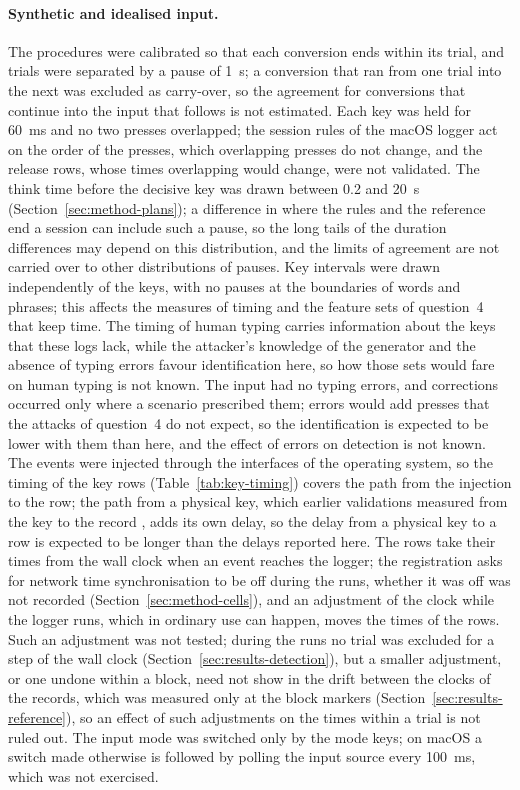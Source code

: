 \paragraph{Synthetic and idealised input.} The procedures were calibrated so that each conversion ends within its trial,
and trials were separated by a pause of 1~s; a conversion that ran from one trial into the next was excluded as
carry-over, so the agreement for conversions that continue into the input that follows is not estimated. Each key was
held for 60~ms and no two presses overlapped; the session rules of the macOS logger act on the order of the presses,
which overlapping presses do not change, and the release rows, whose times overlapping would change, were not validated.
The think time before the decisive key was drawn between 0.2 and 20~s (Section~\ref{sec:method-plans}); a difference
in where the rules and the reference end a session can include such a pause, so the long tails of the duration
differences may depend on this distribution, and the limits of agreement are not carried over to other distributions
of pauses. Key intervals were drawn independently of the keys, with no pauses at the boundaries of words and phrases;
this affects the measures of timing and the feature sets of question~4 that keep time. The timing of human typing
carries information about the keys \citep{monaco2018} that these logs lack, while the attacker's knowledge of the
generator and the absence of typing errors favour identification here, so how those sets would fare on human typing is
not known. The input had no typing errors, and
corrections occurred only where a scenario prescribed them; errors would add presses that the attacks of question~4 do
not expect, so the identification is expected to be lower with them than here, and the effect of errors on detection is
not known. The events were injected through the interfaces of the operating system, so the timing of the key rows
(Table~\ref{tab:key-timing}) covers the path from the injection to the row; the path from a physical key, which earlier
validations measured from the key to the record \citep{pinet2017}, adds its own delay, so the delay from a physical key
to a row is expected to be longer than the delays reported here. The rows take their times from the wall clock when an
event reaches the logger; the registration asks for network time synchronisation to be off during the runs, whether it
was off was not recorded (Section~\ref{sec:method-cells}), and an adjustment of the clock while the logger runs, which
in ordinary use can happen, moves the times of the rows. Such an adjustment was not tested; during the runs no trial was
excluded for a step of the wall clock (Section~\ref{sec:results-detection}), but a smaller adjustment, or one undone
within a block, need not show in the drift between the clocks of the records, which was measured only at the block
markers (Section~\ref{sec:results-reference}), so an effect of such adjustments on the times within a trial is not
ruled out. The input mode was switched only by the mode keys; on macOS a switch made
otherwise is followed by polling the input source every 100~ms, which was not exercised.

